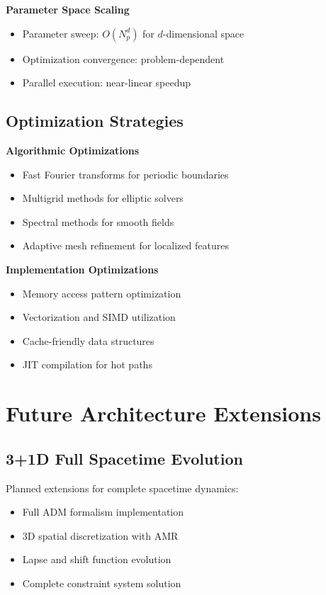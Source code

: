 \documentclass[11pt]{article}
\begin{document}
\textbf{Parameter Space Scaling}
\begin{itemize}
\item Parameter sweep: $O(N_p^d)$ for $d$-dimensional space
\item Optimization convergence: problem-dependent
\item Parallel execution: near-linear speedup
\end{itemize}

\subsection{Optimization Strategies}

\textbf{Algorithmic Optimizations}
\begin{itemize}
\item Fast Fourier transforms for periodic boundaries
\item Multigrid methods for elliptic solvers
\item Spectral methods for smooth fields
\item Adaptive mesh refinement for localized features
\end{itemize}

\textbf{Implementation Optimizations}
\begin{itemize}
\item Memory access pattern optimization
\item Vectorization and SIMD utilization
\item Cache-friendly data structures
\item JIT compilation for hot paths
\end{itemize}

\section{Future Architecture Extensions}

\subsection{3+1D Full Spacetime Evolution}

Planned extensions for complete spacetime dynamics:
\begin{itemize}
\item Full ADM formalism implementation
\item 3D spatial discretization with AMR
\item Lapse and shift function evolution
\item Complete constraint system solution
\end{itemize}
\end{document}
